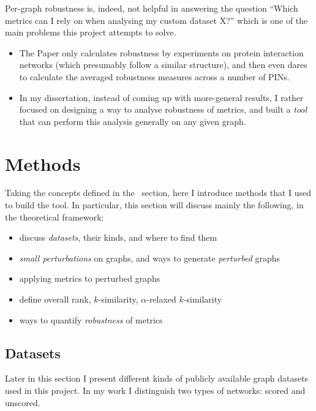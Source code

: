 Per-graph robustness is, indeed, not helpful in answering the question ``Which metrics can I rely on when analysing my custom dataset X?'' which is one of the main problems this project attempts to solve.
\begin{itemize}
    \item The Paper only calculates robustness by experiments on protein interaction networks (which presumably follow a similar structure), and then even dares to calculate the averaged robustness measures across a number of PINs.
    \item In my dissertation, instead of coming up with more-general results, I rather focused on designing a way to analyse robustness of metrics, and built a \textsl{tool} that can perform this analysis generally on any given graph.
\end{itemize}


\section{Methods}\label{sec:methods}

Taking the concepts defined in the~ section, here I introduce methods that I used to build the \graffs tool.
In particular, this section will discuss mainly the following, in the theoretical framework:
\begin{itemize}
    \item discuss \textsl{datasets}, their kinds, and where to find them
    \item \textsl{small perturbations} on graphs, and ways to generate \textsl{perturbed} graphs
    \item applying metrics to perturbed graphs
    \item define overall rank, $k$-similarity, $\alpha$-relaxed $k$-similarity
    \item ways to quantify \textsl{robustness} of metrics
\end{itemize}

\subsection{Datasets}\label{sec:datasets}

Later in this section I present different kinds of publicly available graph datasets used in this project.
In my work I distinguish two types of networks: scored and unscored.


